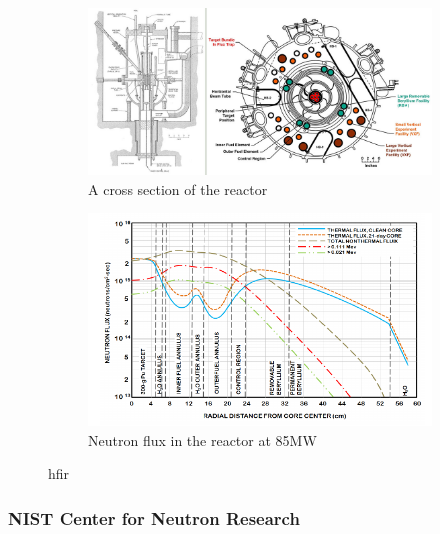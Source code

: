 \begin{figure}[htb]
\centering
\begin{subfigure}{.44\textwidth}
  \centering
    \includegraphics[width=.98\linewidth]{chapters/isotope_activation_and_radioactive_decay/images/hfir-cross-sections.jpg}
    \caption{A cross section of the reactor\cite{hfirornl}}
    \label{fig:hfirxs}
\end{subfigure}
\begin{subfigure}{.44\textwidth}
  \centering
    \includegraphics[width=.98\linewidth]{chapters/isotope_activation_and_radioactive_decay/images/hfirneutronflux.png}
    \caption{Neutron flux in the reactor at 85MW\cite{hfiruserguide}}
    \label{fig:hfirflux}
\end{subfigure}
\caption{\acrlong{hfir}}
\label{fig:hfir}
\end{figure}



\FloatBarrier
\subsubsection{NIST Center for Neutron Research}

